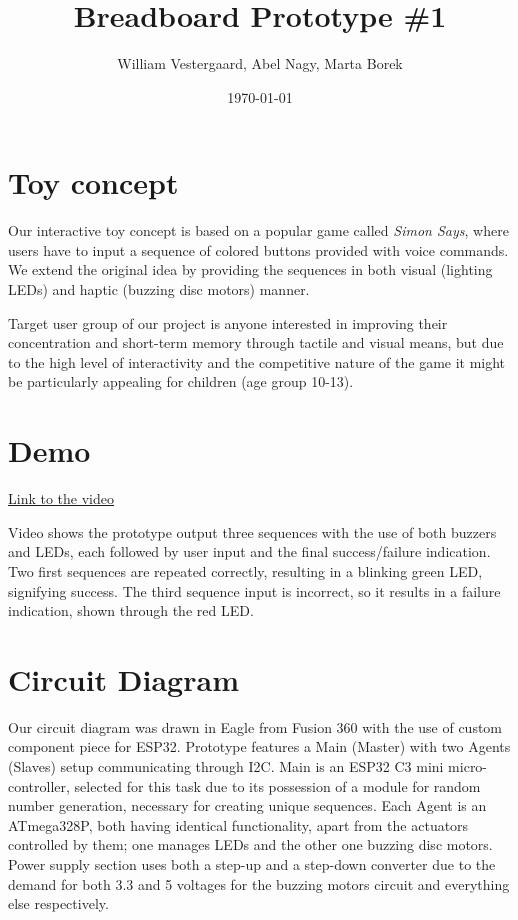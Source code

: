 \documentclass[a4paper]{article}
\title{Breadboard Prototype \#1}
\author{William Vestergaard, Abel Nagy, Marta Borek}
\date{\today}
\begin{document}
\maketitle	
\section{Toy concept}

\noindent Our interactive toy concept is based on a popular game called \textit{Simon Says}, where users have to input a sequence of colored buttons provided with voice commands. We extend the original idea by providing the sequences in both visual (lighting LEDs) and haptic (buzzing disc motors) manner.


\noindent Target user group of our project is anyone interested in improving their concentration and short-term memory through tactile and visual means, but due to the high level of interactivity and the competitive nature of the game it might be particularly appealing for children (age group 10-13).

\section{Demo}
\href{https://aarhusuniversitet-my.sharepoint.com/:v:/g/personal/au802349_uni_au_dk/EYu93GnpKyVOjn9N1xiUcd0BokxDAjE5eCbD5Ibb2XIgbQ?nav=eyJyZWZlcnJhbEluZm8iOnsicmVmZXJyYWxBcHAiOiJPbmVEcml2ZUZvckJ1c2luZXNzIiwicmVmZXJyYWxBcHBQbGF0Zm9ybSI6IldlYiIsInJlZmVycmFsTW9kZSI6InZpZXciLCJyZWZlcnJhbFZpZXciOiJNeUZpbGVzTGlua0NvcHkifX0&e=tQ1Llt}{Link to the video}

\noindent Video shows the prototype output three sequences with the use of both buzzers and LEDs, each followed by user input and the final success/failure indication. Two first sequences are repeated correctly, resulting in a blinking green LED, signifying success. The third sequence input is incorrect, so it results in a failure indication, shown through the red LED.

\section{Circuit Diagram}
Our circuit diagram was drawn in Eagle from Fusion 360 with the use of custom component piece for ESP32.
Prototype features a Main (Master) with two Agents (Slaves) setup communicating through I2C. Main is an ESP32 C3 mini micro-controller, selected for this task due to its possession of a module for random number generation, necessary for creating unique sequences.
Each Agent is an ATmega328P, both having identical functionality, apart from the actuators controlled by them; one manages LEDs and the other one buzzing disc motors.
Power supply section uses both a step-up and a step-down converter due to the demand for both 3.3 and 5 voltages for the buzzing motors circuit and everything else respectively.
\end{document}
